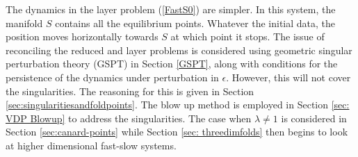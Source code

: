The dynamics in the layer problem (\ref{FastS0}) are simpler. In this system, the manifold $S$ contains all the equilibrium points. Whatever the initial data, the position moves horizontally towards $S$ at which point it stops. The issue of reconciling the reduced and layer problems is considered using geometric singular perturbation theory (GSPT) in Section \ref{GSPT}, along with conditions for the persistence of the dynamics under perturbation in $\epsilon$. However, this will not cover the singularities. The reasoning for this is given in Section \ref{sec:singularitiesandfoldpoints}. The blow up method is employed in Section \ref{sec: VDP Blowup} to address the singularities. The case when $\lambda \neq 1$ is considered in Section \ref{sec:canard-points} while  Section \ref{sec: threedimfolds} then begins to look at higher dimensional fast-slow systems.



%



